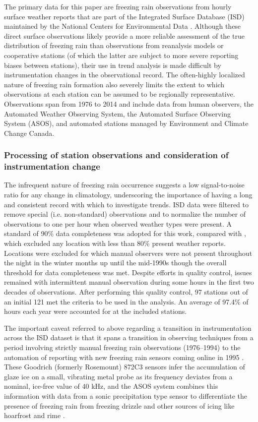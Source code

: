\documentclass[twocol]{ametsoc}
\begin{document}
The primary data for this paper are freezing rain observations from hourly surface weather reports that are part of the Integrated Surface Database (ISD) maintained by the National Centers for Environmental Data \citep{smith2011integrated}. Although these direct surface observations likely provide a more reliable assessment of the true distribution of freezing rain than observations from reanalysis models or cooperative stations (of which the latter are subject to more severe reporting biases between stations), their use in trend analysis is made difficult by instrumentation changes in the observational record. The often-highly localized nature of freezing rain formation also severely limits the extent to which observations at each station can be assumed to be regionally representative. Observations span from 1976 to 2014 and include data from human observers, the Automated Weather Observing System, the Automated Surface Observing System (ASOS), and automated stations managed by Environment and Climate Change Canada.

\subsubsection{Processing of station observations and consideration of instrumentation change}
The infrequent nature of freezing rain occurrence suggests a low signal-to-noise ratio for any change in climatology, underscoring the importance of having a long and consistent record with which to investigate trends. ISD data were filtered to remove special (i.e. non-standard) observations and to normalize the number of observations to one per hour when observed weather types were present. A standard of 90\% data completeness was adopted for this work, compared with \citet{cortinas2000climatology}, which excluded any location with less than 80\% present weather reports. Locations were excluded for which manual observers were not present throughout the night in the winter months up until the mid-1990s though the overall threshold for data completeness was met. Despite efforts in quality control, issues remained with intermittent manual observation during some hours in the first two decades of observations. After performing this quality control, 97 stations out of an initial 121 met the criteria to be used in the analysis. An average of 97.4\% of hours each year were accounted for at the included stations.

The important caveat referred to above regarding a transition in instrumentation across the ISD dataset is that it spans a transition in observing techniques from a period involving strictly manual freezing rain observations (1976--1994) to the automation of reporting with new freezing rain sensors coming online in 1995 \citep{ramsay1995status}. These Goodrich (formerly Rosemount) 872C3 sensors infer the accumulation of glaze ice on a small, vibrating metal probe as its frequency deviates from a nominal, ice-free value of 40 kHz, and the ASOS system combines this information with data from a sonic precipitation type sensor to differentiate the presence of freezing rain from freezing drizzle and other sources of icing like hoarfrost and rime \citep{asos1998}.
\end{document}
